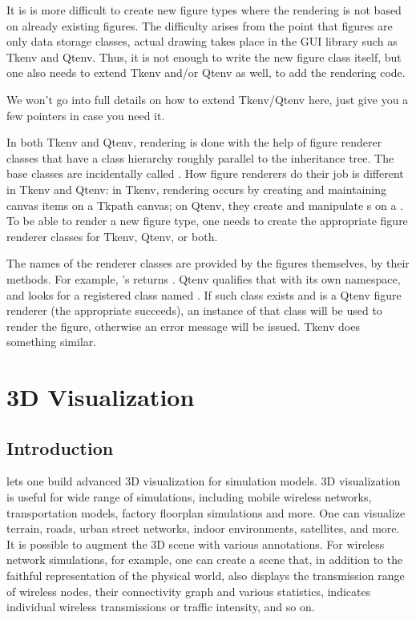 It is is more difficult to create new figure types where the rendering is not
based on already existing figures. The difficulty arises from the point that
figures are only data storage classes, actual drawing takes place in the
GUI library such as Tkenv and Qtenv. Thus, it is not enough to write the new
figure class itself, but one also needs to extend Tkenv and/or Qtenv as well,
to add the rendering code.

We won't go into full details on how to extend Tkenv/Qtenv here, just give
you a few pointers in case you need it.

In both Tkenv and Qtenv, rendering is done with the help of figure renderer
classes that have a class hierarchy roughly parallel to the
 inheritance tree. The base classes are incidentally called
. How figure renderers do their job is different in
Tkenv and Qtenv: in Tkenv, rendering occurs by creating and maintaining
canvas items on a Tkpath canvas; on Qtenv, they create and manipulate
s on a . To be able to render a
new figure type, one needs to create the appropriate figure renderer
classes for Tkenv, Qtenv, or both.

The names of the renderer classes are provided by the figures themselves,
by their  methods. For example,
's  returns
. Qtenv qualifies that with its own namespace, and
looks for a registered class named
. If such class exists and is a
Qtenv figure renderer (the appropriate  succeeds), an
instance of that class will be used to render the figure, otherwise an
error message will be issued. Tkenv does something similar.


\section{3D Visualization}
\label{sec:graphics:osg}

\subsection{Introduction}
\label{sec:graphics:osg-introduction}

{\opp} lets one build advanced 3D visualization for simulation models.
3D visualization is useful for wide range of simulations, including
mobile wireless networks, transportation models, factory floorplan
simulations and more. One can visualize terrain, roads, urban street
networks, indoor environments, satellites, and more. It is possible to
augment the 3D scene with various annotations. For wireless network
simulations, for example, one can create a scene that, in addition to
the faithful representation of the physical world, also displays the
transmission range of wireless nodes, their connectivity graph
and various statistics, indicates individual wireless transmissions
or traffic intensity, and so on.

